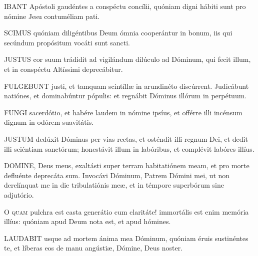 

\lettrine[lines=2]{I}{BANT} Apóstoli gaudéntes a conspéctu concílii, quóniam digni hábiti sunt pro nómine Jesu contuméliam pati.


\lettrine[lines=2]{S}{CIMUS} quóniam diligéntibus Deum ómnia cooperántur in bonum, iis qui secúndum propósitum vocáti sunt sancti.


\lettrine[lines=2]{J}{USTUS} cor suum trádidit ad vigilándum dilúculo ad Dóminum, qui fecit illum, et in conspéctu Altíssimi deprecábitur.


\lettrine[lines=2]{F}{ULGEBUNT} justi, et tamquam scintíllæ in arundinéto discúrrent. Judicábunt natiónes, et dominabúntur pópulis: et regnábit Dóminus illórum in perpétuum.


\lettrine[lines=2]{F}{UNGI} sacerdótio, et habére laudem in nómine ipsíus, et offérre illi incénsum dignum in odórem suavitátis.


\lettrine[lines=2]{J}{USTUM} dedúxit Dóminus per vias rectas, et osténdit illi regnum Dei, et dedit illi sciéntiam sanctórum; honestávit illum in labóribus, et complévit labóres illíus.


\lettrine[lines=2]{D}{OMINE}, Deus meus, exaltásti super terram habitatiónem meam, et pro morte defluénte deprecáta sum. Invocávi Dóminum, Patrem Dómini mei, ut non derelínquat me in die tribulatiónis meæ, et in témpore superbórum sine adjutório.


\lettrine[lines=2]{O}{} \textsc{quam} pulchra est casta generátio cum claritáte! immortális est enim memória illíus: quóniam apud Deum nota est, et apud hómines.


\lettrine[lines=2]{L}{AUDABIT} usque ad mortem ánima mea Dóminum, quóniam éruis sustinéntes te, et líberas eos de manu angústiæ, Dómine, Deus noster.

